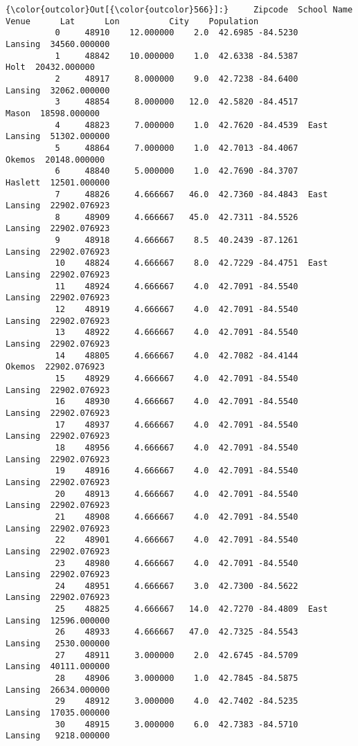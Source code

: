 \documentclass[11pt]{article}
\begin{document}
\begin{Verbatim}[commandchars=\\\{\}]
{\color{outcolor}Out[{\color{outcolor}566}]:}     Zipcode  School Name  Venue      Lat      Lon          City    Population
          0     48910    12.000000    2.0  42.6985 -84.5230       Lansing  34560.000000
          1     48842    10.000000    1.0  42.6338 -84.5387          Holt  20432.000000
          2     48917     8.000000    9.0  42.7238 -84.6400       Lansing  32062.000000
          3     48854     8.000000   12.0  42.5820 -84.4517         Mason  18598.000000
          4     48823     7.000000    1.0  42.7620 -84.4539  East Lansing  51302.000000
          5     48864     7.000000    1.0  42.7013 -84.4067        Okemos  20148.000000
          6     48840     5.000000    1.0  42.7690 -84.3707       Haslett  12501.000000
          7     48826     4.666667   46.0  42.7360 -84.4843  East Lansing  22902.076923
          8     48909     4.666667   45.0  42.7311 -84.5526       Lansing  22902.076923
          9     48918     4.666667    8.5  40.2439 -87.1261       Lansing  22902.076923
          10    48824     4.666667    8.0  42.7229 -84.4751  East Lansing  22902.076923
          11    48924     4.666667    4.0  42.7091 -84.5540       Lansing  22902.076923
          12    48919     4.666667    4.0  42.7091 -84.5540       Lansing  22902.076923
          13    48922     4.666667    4.0  42.7091 -84.5540       Lansing  22902.076923
          14    48805     4.666667    4.0  42.7082 -84.4144        Okemos  22902.076923
          15    48929     4.666667    4.0  42.7091 -84.5540       Lansing  22902.076923
          16    48930     4.666667    4.0  42.7091 -84.5540       Lansing  22902.076923
          17    48937     4.666667    4.0  42.7091 -84.5540       Lansing  22902.076923
          18    48956     4.666667    4.0  42.7091 -84.5540       Lansing  22902.076923
          19    48916     4.666667    4.0  42.7091 -84.5540       Lansing  22902.076923
          20    48913     4.666667    4.0  42.7091 -84.5540       Lansing  22902.076923
          21    48908     4.666667    4.0  42.7091 -84.5540       Lansing  22902.076923
          22    48901     4.666667    4.0  42.7091 -84.5540       Lansing  22902.076923
          23    48980     4.666667    4.0  42.7091 -84.5540       Lansing  22902.076923
          24    48951     4.666667    3.0  42.7300 -84.5622       Lansing  22902.076923
          25    48825     4.666667   14.0  42.7270 -84.4809  East Lansing  12596.000000
          26    48933     4.666667   47.0  42.7325 -84.5543       Lansing   2530.000000
          27    48911     3.000000    2.0  42.6745 -84.5709       Lansing  40111.000000
          28    48906     3.000000    1.0  42.7845 -84.5875       Lansing  26634.000000
          29    48912     3.000000    4.0  42.7402 -84.5235       Lansing  17035.000000
          30    48915     3.000000    6.0  42.7383 -84.5710       Lansing   9218.000000
\end{Verbatim}
            
\end{document}
